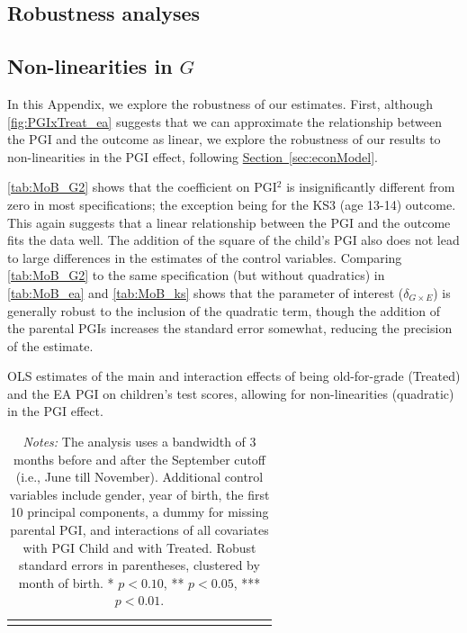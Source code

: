 \documentclass[12pt,a4paper]{article}
\begin{document}
\begin{bibunit}
\clearpage
\renewcommand{\thetable}{F.\arabic{table}}
\renewcommand{\thefigure}{F.\arabic{figure}}
\renewcommand{\theequation}{F.\arabic{equation}}
\setcounter{table}{0} 
\setcounter{figure}{0} 
\setcounter{equation}{0} 

\section{Robustness analyses} \label{appsec:robustness}

\subsection{Non-linearities in \texorpdfstring{$G$}{G}}
In this Appendix, we explore the robustness of our estimates. First, although \autoref{fig:PGIxTreat_ea} suggests that we can approximate the relationship between the PGI and the outcome as linear, we explore the robustness of our results to non-linearities in the PGI effect, following \hyperref[sec:econModel]{Section~\ref*{sec:econModel}}.

\autoref{tab:MoB_G2} shows that the coefficient on PGI$^2$ is insignificantly different from zero in most specifications; the exception being for the KS3 (age 13-14) outcome. This again suggests that a linear relationship between the PGI and the outcome fits the data well. The addition of the square of the child's PGI also does not lead to large differences in the estimates of the control variables. Comparing \autoref{tab:MoB_G2} to the same specification (but without quadratics) in \autoref{tab:MoB_ea} and \autoref{tab:MoB_ks} shows that the parameter of interest ($\delta_{G \times E}$) is generally robust to the inclusion of the quadratic term, though the addition of the parental PGIs increases the standard error somewhat, reducing the precision of the estimate. 

\addtolength{\tabcolsep}{-0.35em}
\renewcommand{\arraystretch}{0.75}
\begin{table}[h]
\caption{OLS estimates of the main and interaction effects of being old-for-grade (Treated) and the EA
PGI on children’s test scores, allowing for non-linearities (quadratic) in the PGI effect.}
\centering
{\scriptsize
\begin{tabular}{lcccccccccccccccccccc}
\toprule

\bottomrule
\addlinespace[.75ex]
\end{tabular}
\label{tab:MoB_G2}
}
\caption*{\scriptsize \noindent \textit{Notes:} The analysis uses a bandwidth of 3 months before and after the September cutoff (i.e., June till November). Additional control variables include gender, year of birth, the first 10 principal components, a dummy for missing parental PGI, and interactions of all covariates with PGI Child and with Treated. Robust standard errors in parentheses, clustered by month of birth. * $p < 0.10$, ** $p < 0.05$, *** $p < 0.01$.}
\end{table}


\end{bibunit}
\end{document}
